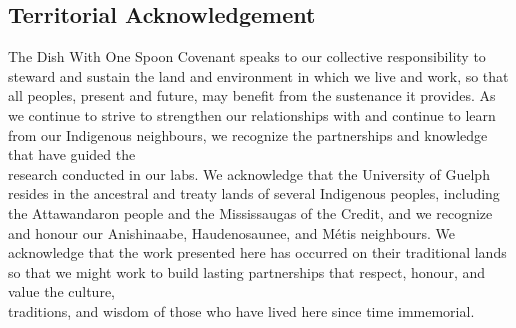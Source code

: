 \begin{itemize}
\section{Territorial Acknowledgement}

The Dish With One Spoon Covenant speaks to our collective responsibility to steward and sustain the land and environment in which we live and work, so that all peoples, present and future, may benefit from the sustenance it provides. As we continue to strive to strengthen our relationships with and continue to learn from our Indigenous neighbours, we recognize the partnerships and knowledge that have guided the 
\\ research conducted in our labs. We acknowledge that the University of Guelph resides in the ancestral and treaty lands of several Indigenous peoples, including the Attawandaron people and the Mississaugas of the Credit, and we recognize and honour our Anishinaabe, Haudenosaunee, and M{\'e}tis neighbours. We acknowledge that the work presented here has occurred on their traditional lands so that we might work to build lasting partnerships that respect, honour, and value the culture, \\ traditions, and wisdom of those who have lived here since time immemorial.


\end{itemize} 